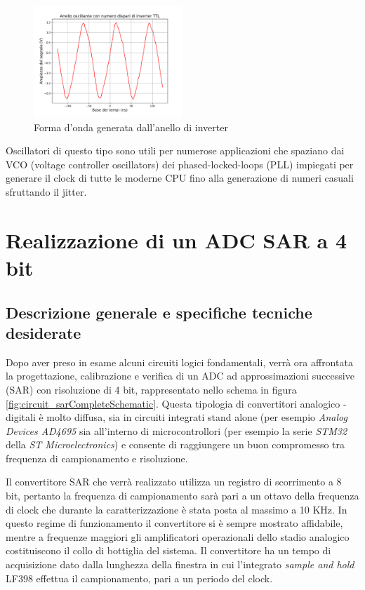 \documentclass[journal]{IEEEtran}
\begin{document}
\begin{figure}[H]%
\begin{center}
\includegraphics[width=0.50\textwidth]{analysis/output/oscillating-ring.pdf}
\caption{Forma d'onda generata dall'anello di inverter}
\label{fig:graph_ring_oscillator}
\end{center}
\end{figure}

Oscillatori di questo tipo sono utili per numerose applicazioni che spaziano dai VCO (voltage controller oscillators) dei phased-locked-loops (PLL) impiegati per generare il clock di tutte le moderne CPU fino alla generazione di numeri casuali sfruttando il jitter.


\section{Realizzazione di un ADC SAR a 4 bit}

\subsection{Descrizione generale e specifiche tecniche desiderate}
Dopo aver preso in esame alcuni circuiti logici fondamentali, verrà ora affrontata la progettazione, calibrazione e verifica di un ADC ad approssimazioni successive (SAR) con risoluzione di 4 bit, rappresentato nello schema in figura \ref{fig:circuit_sarCompleteSchematic}. Questa tipologia di convertitori analogico - digitali è molto diffusa, sia in circuiti integrati stand alone (per esempio \textit{Analog Devices AD4695} sia all'interno di microcontrollori (per esempio la serie \textit{STM32} della \textit{ST Microelectronics}) e consente di raggiungere un buon compromesso tra frequenza di campionamento e risoluzione.

Il convertitore SAR che verrà realizzato utilizza un registro di scorrimento a 8 bit, pertanto la frequenza di campionamento sarà pari a un ottavo della frequenza di clock che durante la caratterizzazione è stata posta al massimo a 10 KHz. In questo regime di funzionamento il convertitore si è sempre mostrato affidabile, mentre a frequenze maggiori gli amplificatori operazionali dello stadio analogico costituiscono il collo di bottiglia del sistema. Il convertitore ha un tempo di acquisizione dato dalla lunghezza della finestra in cui l'integrato \textit{sample and hold} LF398 effettua il campionamento, pari a un periodo del clock.
\end{document}
